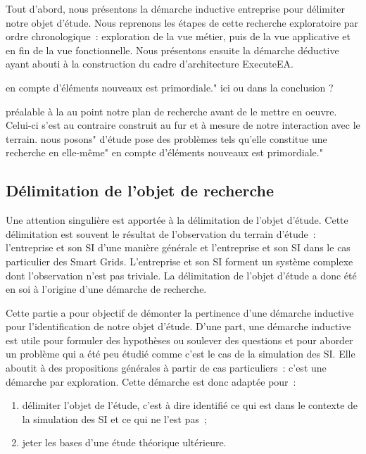 {Tout d'abord, nous présentons la démarche inductive entreprise pour délimiter 
notre objet d'étude. Nous reprenons les étapes de cette recherche exploratoire 
par ordre chronologique~: exploration de la vue métier, puis de la vue 
applicative et en fin de la vue fonctionnelle. Nous présentons ensuite la 
démarche déductive ayant abouti à la construction du cadre d'architecture 
ExecuteEA.

en compte d'éléments nouveaux est primordiale." ici ou dans la conclusion ?

préalable à la 
au point notre plan de recherche avant de le mettre en oeuvre. Celui-ci s'est au 
contraire construit au fur et à mesure de notre interaction avec le terrain.
%
nous posons"
d'étude pose des problèmes tels qu'elle constitue une recherche en elle-même"
en compte d'éléments nouveaux est primordiale."


	\subsection{Délimitation de l'objet de recherche}
		
	Une attention singulière est apportée à la délimitation de l'objet d'étude. 
Cette délimitation est souvent le résultat de l'observation du terrain d'étude~: 
l'entreprise et son SI d'une manière générale et l'entreprise et son SI dans le 
cas particulier des Smart Grids. L'entreprise et son SI forment un système 
complexe dont l'observation n'est pas triviale. La délimitation de l'objet 
d'étude a donc été en soi à l'origine d'une démarche de recherche.
	
	Cette partie a pour objectif de démonter la pertinence d'une démarche inductive 
pour l'identification de notre objet d'étude. D'une part, une démarche inductive 
est utile pour formuler des hypothèses ou soulever des questions et pour aborder 
un problème qui a été peu étudié comme c'est le cas de la simulation des SI. 
Elle aboutit à des propositions générales à partir de cas particuliers~: c'est 
une démarche par exploration. 
	Cette démarche est donc adaptée pour~: 
	\begin{enumerate}
	\item délimiter l'objet de l'étude, c'est à dire identifié ce qui est dans le 
contexte de la simulation des SI et ce qui ne l'est pas~;
	\item jeter les bases d'une étude théorique ultérieure.
	\end{enumerate}
	
}
